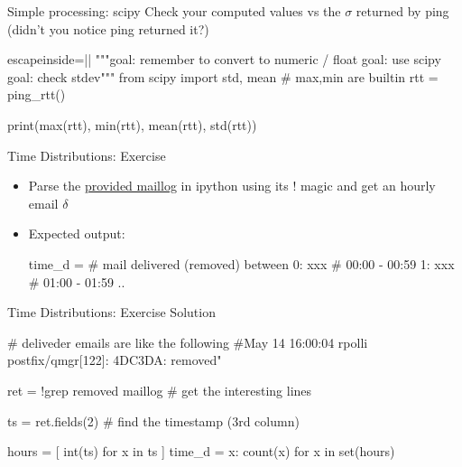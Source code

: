 \begin{pyframe}{Simple processing: scipy}
Check your computed values vs the $\sigma$ returned by ping 
(didn't you notice ping returned it?) 
\begin{pycode*}{escapeinside=||}
"""goal: remember to convert to numeric / float
   goal: use scipy
   goal: check stdev"""
from scipy import std, mean # max,min are builtin
rtt = ping_rtt()

print(max(rtt), min(rtt), mean(rtt), std(rtt))

\end{pycode*}
\end{pyframe}

\begin{pyframe}{Time Distributions: Exercise}
\begin{itemize}
\item Parse the \href{https://github.com/ioggstream/python-course/blob/master/python-for-sysadmin/data/maillog}{provided maillog} in ipython using its ! magic and get an hourly email $\delta$
\item Expected output: 
\begin{pycode}
time_d = {  # mail delivered (removed) between
    0: xxx  #  00:00 - 00:59
    1: xxx  #  01:00 - 01:59
    ..
    }
\end{pycode}
\end{itemize}
\end{pyframe}
 
\iftrue
\begin{pyframe}{Time Distributions: Exercise Solution}
\begin{pycode}
# deliveder emails are like the following 
#May 14 16:00:04 rpolli postfix/qmgr[122]: 4DC3DA: removed"
    
ret = !grep removed maillog # get the interesting lines

ts = ret.fields(2) # find the timestamp (3rd column)

hours = [ int(ts)  for x in ts ]
time_d = {x: count(x) for x in set(hours)}
\end{pycode}
\end{pyframe}

\fi 

